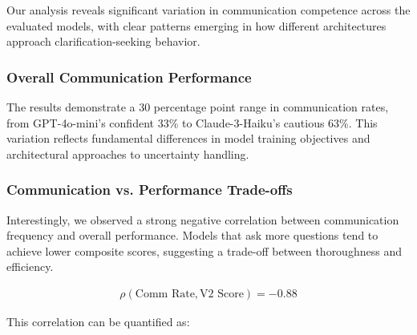 \documentclass[conference]{IEEEtran}
\begin{document}
Our analysis reveals significant variation in communication competence across the evaluated models, with clear patterns emerging in how different architectures approach clarification-seeking behavior.

\subsubsection{Overall Communication Performance}

\begin{table}[ht]
\centering
\small
\caption{Communication Competence Results Across Models}
\label{tab:communication_results}
\end{table}

The results demonstrate a 30 percentage point range in communication rates, from GPT-4o-mini's confident 33\% to Claude-3-Haiku's cautious 63\%. This variation reflects fundamental differences in model training objectives and architectural approaches to uncertainty handling.

\subsubsection{Communication vs. Performance Trade-offs}

Interestingly, we observed a strong negative correlation between communication frequency and overall performance. Models that ask more questions tend to achieve lower composite scores, suggesting a trade-off between thoroughness and efficiency.

\begin{align}
\rho(\text{Comm Rate}, \text{V2 Score}) = -0.88
\end{align}

This correlation can be quantified as:
\end{document}

